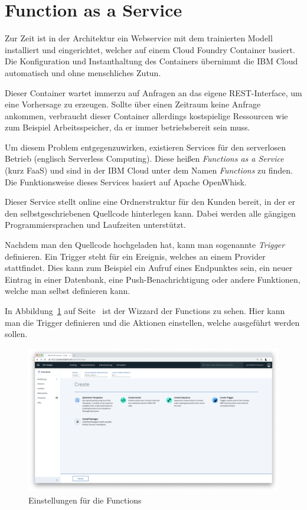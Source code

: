 \section{Function as a Service}
Zur Zeit ist in der Architektur ein Webservice mit dem trainierten Modell installiert und eingerichtet, welcher auf
einem Cloud Foundry Container basiert. Die Konfiguration und Instanthaltung des Containers übernimmt die IBM Cloud
automatisch und ohne menschliches Zutun.

Dieser Container wartet immerzu auf Anfragen an das eigene REST-Interface, um eine Vorhersage zu erzeugen. Sollte über
einen Zeitraum keine Anfrage ankommen, verbraucht dieser Container allerdings kostspielige Ressourcen wie zum Beispiel
Arbeitsspeicher, da er immer betriebsbereit sein muss.

Um diesem Problem entgegenzuwirken, existieren Services für den serverlosen Betrieb (englisch Serverless Computing).
Diese heißen \textit{Functions as a Service} (kurz FaaS) und sind in der IBM Cloud unter dem Namen \textit{Functions}
zu finden. Die Funktionsweise dieses Services basiert auf Apache OpenWhisk.

Dieser Service stellt online eine Ordnerstruktur für den Kunden bereit, in der er den selbstgeschriebenen Quellcode
hinterlegen kann. Dabei werden alle gängigen Programmiersprachen und Laufzeiten unterstützt.

Nachdem man den Quellcode hochgeladen hat, kann man sogenannte \textit{Trigger} definieren. Ein Trigger steht für ein
Ereignis, welches an einem Provider stattfindet. Dies kann zum Beispiel ein Aufruf eines Endpunktes sein, ein neuer
Eintrag in einer Datenbank, eine Push-Benachrichtigung oder andere Funktionen, welche man selbst definieren kann.

In Abbildung~\ref{fig:ausblick_functions} auf Seite~\pageref{fig:ausblick_functions} ist der Wizzard der Functions zu
sehen. Hier kann man die Trigger definieren und die Aktionen einstellen, welche ausgeführt werden sollen.

\begin{figure}[h]
    \centering
    \includegraphics[width=\textwidth]{images/kapitel_6/functions_wizzard.png}
    \caption{Einstellungen für die Functions}
    \label{fig:ausblick_functions}
\end{figure}

